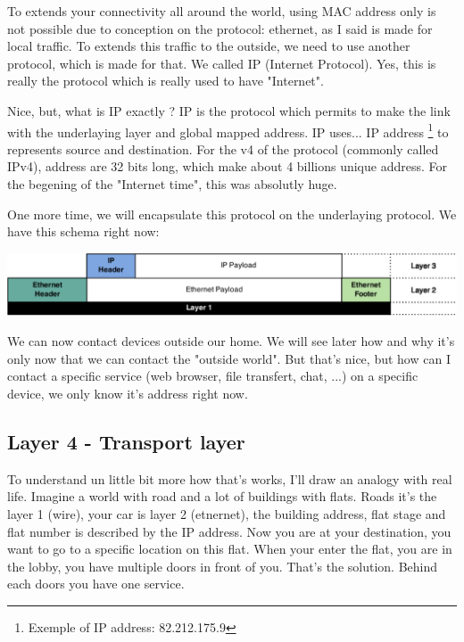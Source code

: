 \documentclass{article}
\begin{document}
	To extends your connectivity all around the world, using MAC address only is not possible due to conception
	on the protocol: ethernet, as I said is made for local traffic. To extends this traffic to the outside, we need
	to use another protocol, which is made for that. We called IP (Internet Protocol). Yes, this is really the protocol
	which is really used to have "Internet".
	
	Nice, but, what is IP exactly ? IP is the protocol which permits to make the link with the underlaying layer
	and global mapped address. IP uses... IP address
	\footnote{Exemple of IP address: 82.212.175.9} to represents source and destination. For the v4 of the protocol
	(commonly called IPv4), address are 32 bits long, which make about 4 billions unique address. For the begening of
	the "Internet time", this was absolutly huge.
	
	One more time, we will encapsulate this protocol on the underlaying protocol. We have this schema right now:
	\begin{center}
	\includegraphics[scale=0.3]{content/layer3.eps}
	\end{center}
	
	We can now contact devices outside our home. We will see later how and why it's only now that we can contact
	the "outside world". But that's nice, but how can I contact a specific service (web browser, file transfert, chat, ...)
	on a specific device, we only know it's address right now.
	
	\subsection{Layer 4 - Transport layer}
	
	To understand un little bit more how that's works, I'll draw an analogy with real life. Imagine a world with
	road and a lot of buildings with flats. Roads it's the layer 1 (wire), your car is layer 2 (etnernet), the building
	address, flat stage and flat number is described by the IP address. Now you are at your destination, you want to
	go to a specific location on this flat. When your enter the flat, you are in the lobby, you have multiple doors
	in front of you. That's the solution. Behind each doors you have one service.
	
\end{document}
